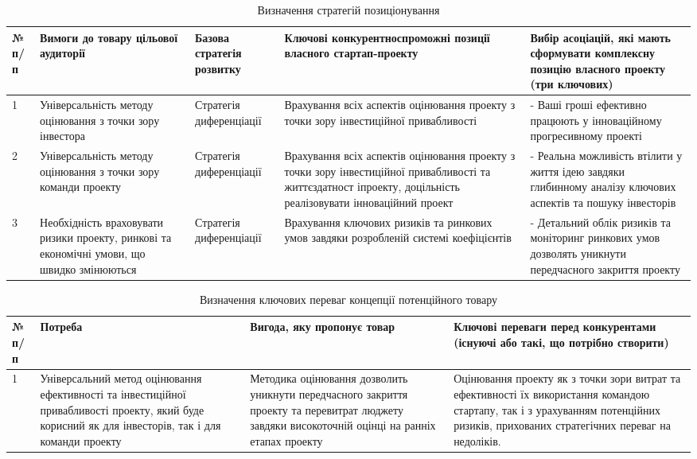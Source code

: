 \begin{table}
	\begin{tabularx}{\textwidth}{|l|X|X|X|X|}
    \hline
    № п/п & Вимоги до товару цільової аудиторії & Базова стратегія розвитку & Ключові конкурентноспроможні позиції власного стартап-проекту & Вибір асоціацій, які мають сформувати комплексну позицію власного проекту (три ключових) \\ \hline
    1 & Універсальність методу оцінювання з точки зору інвестора & Стратегія диференціації & Врахування всіх аспектів оцінювання проекту з точки зору інвестиційної привабливості & - Ваші гроші ефективно працюють у інноваційному прогресивному проекті \\ \hline
    2 & Універсальність методу оцінювання з точки зору команди проекту & Стратегія диференціації & Врахування всіх аспектів оцінювання проекту з точки зору інвестиційної привабливості та життєздатност іпроекту, доцільність реалізовувати інноваційний проект & - Реальна можливість втілити у життя ідею завдяки глибинному аналізу ключових аспектів та пошуку інвесторів \\ \hline
    3 & Необхідність враховувати ризики проекту, ринкові та економічні умови, що швидко змінюються & Стратегія диференціації & Врахування ключових ризиків та ринкових умов завдяки розробленій системі коефіцієнтів & - Детальний облік ризиків та моніторинг ринкових умов дозволять уникнути передчасного закриття проекту \\
    \hline
    \end{tabularx}
\caption{Визначення стратегій позиціонування} \label{tab:sometab}
\end{table}

\begin{table}
	\begin{tabularx}{\textwidth}{|l|X|X|X|}
    \hline
    № п/п & Потреба & Вигода, яку пропонує товар & Ключові переваги перед конкурентами (існуючі або такі, що потрібно створити) \\ \hline
    1 & Універсальний метод оцінювання ефективності та інвестиційної привабливості проекту, який буде корисний як для інвесторів, так і для команди проекту & Методика оцінювання дозволить уникнути передчасного закриття проекту та перевитрат люджету завдяки високоточній оцінці на ранніх етапах проекту & Оцінювання проекту як з точки зори витрат та ефективності їх використання командою стартапу, так і з урахуванням потенційних ризиків, прихованих стратегічних переваг на недоліків. \\
    \hline
    \end{tabularx}
\caption{Визначення ключових переваг концепції потенційного товару} \label{tab:sometab}
\end{table}

